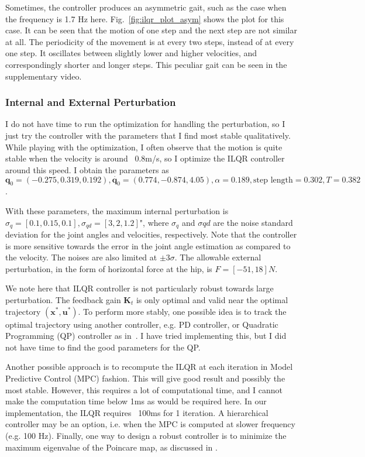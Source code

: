 Sometimes, the controller produces an asymmetric gait, such as the case when the frequency is 1.7 Hz here. Fig.~\ref{fig:ilqr_plot_asym} shows the plot for this case. It can be seen that the motion of one step and the next step are not similar at all. The periodicity of the movement is at every two steps, instead of at every one step. It oscillates between slightly lower and higher velocities, and correspondingly shorter and longer steps. This peculiar gait can be seen in the supplementary video. 

\subsubsection{Internal and External Perturbation}
I do not have time to run the optimization for handling the perturbation, so I just try the controller with the parameters that I find most stable qualitatively. While playing with the optimization, I often observe that the motion is quite stable when the velocity is around ~0.8m/s, so I optimize the ILQR controller around this speed. I obtain the parameters as $\bm{q}_0 = (-0.275,  0.319,  0.192),\dot{\bm{q}_0} = (0.774, -0.874,  4.05), \alpha = 0.189, \text{step length} = 0.302, T = 0.382$.

With these parameters, the maximum internal perturbation is $\sigma_q = [0.1, 0.15, 0.1 ], \sigma_{qd} = [3, 2, 1.2]$", where $\sigma_q$ and $\sigma{qd}$ are the noise standard deviation for the joint angles and velocities, respectively. Note that the controller is more sensitive towards the error in the joint angle estimation as compared to the velocity. The noises are also limited at $\pm 3\sigma$. The allowable external perturbation, in the form of horizontal force at the hip, is $F = [-51, 18] N$. 

We note here that ILQR controller is not particularly robust towards large perturbation. The feedback gain $\bm{K}_t$ is only optimal and valid near the optimal trajectory $(\bm{x}^*, \bm{u}^*)$. To perform more stably, one possible idea is to track the optimal trajectory using another controller, e.g. PD controller, or Quadratic Programming (QP) controller as in~\cite{park2017high}. I have tried implementing this, but I did not have time to find the good parameters for the QP. 

Another possible approach is to recompute the ILQR at each iteration in Model Predictive Control (MPC) fashion. This will give good result and possibly the most stable. However, this requires a lot of computational time, and I cannot make the computation time below 1ms as would be required here. In our implementation, the ILQR requires ~100ms for 1 iteration. A hierarchical controller may be an option, i.e. when the MPC is computed at slower frequency (e.g. 100 Hz). Finally, one way to design a robust controller is to minimize the maximum eigenvalue of the Poincare map, as discussed in \cite{park2017high}.  


